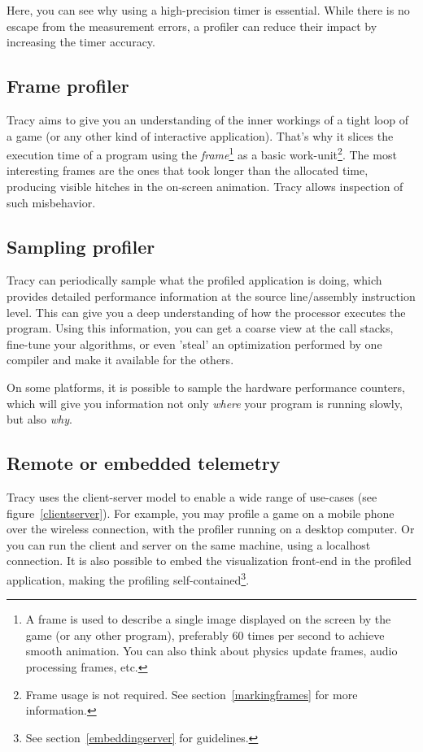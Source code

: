 \documentclass[hidelinks,titlepage,a4paper]{article}
\begin{document}
Here, you can see why using a high-precision timer is essential. While there is no escape from the measurement errors, a profiler can reduce their impact by increasing the timer accuracy.

\subsection{Frame profiler}

Tracy aims to give you an understanding of the inner workings of a tight loop of a game (or any other kind of interactive application). That's why it slices the execution time of a program using the \emph{frame}\footnote{A frame is used to describe a single image displayed on the screen by the game (or any other program), preferably 60 times per second to achieve smooth animation. You can also think about physics update frames, audio processing frames, etc.} as a basic work-unit\footnote{Frame usage is not required. See section~\ref{markingframes} for more information.}. The most interesting frames are the ones that took longer than the allocated time, producing visible hitches in the on-screen animation. Tracy allows inspection of such misbehavior.

\subsection{Sampling profiler}

Tracy can periodically sample what the profiled application is doing, which provides detailed performance information at the source line/assembly instruction level. This can give you a deep understanding of how the processor executes the program. Using this information, you can get a coarse view at the call stacks, fine-tune your algorithms, or even 'steal' an optimization performed by one compiler and make it available for the others.

On some platforms, it is possible to sample the hardware performance counters, which will give you information not only \emph{where} your program is running slowly, but also \emph{why}.

\subsection{Remote or embedded telemetry}

Tracy uses the client-server model to enable a wide range of use-cases (see figure~\ref{clientserver}). For example, you may profile a game on a mobile phone over the wireless connection, with the profiler running on a desktop computer. Or you can run the client and server on the same machine, using a localhost connection. It is also possible to embed the visualization front-end in the profiled application, making the profiling self-contained\footnote{See section~\ref{embeddingserver} for guidelines.}.
\end{document}
